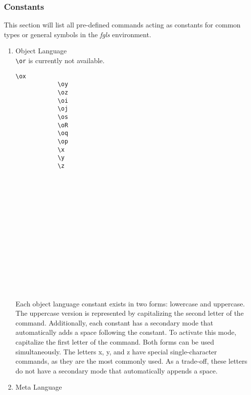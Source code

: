 \documentclass[10pt, a4paper]{article}
\begin{document}
	\subsubsection{Constants}
	This section will list all pre-defined commands acting as constants for common types or general symbols in the \textit{fgls} environment.
	\begin{enumerate}
		\item Object Language\\\verb=\or= is currently not available.
		\begin{center}
			\begin{minipage}[h][4.8cm][t]{15em}
				\begin{lstlisting}[style=B]
			\ox
			\oy
			\oz
			\oi
			\oj
			\os
			\oR
			\oq
			\op
			\x
			\y
			\z
				\end{lstlisting}
			\end{minipage}
			\begin{minipage}[h][4.8cm][t]{15em}
				\begin{fgls}
					\ \\
					\ox\\
					\oy\\
					\oz\\
					\oi\\
					\oj\\
					\os\\
					\oR\\
					\oq\\
					\op\\
					\x\\
					\y\\
					\z
				\end{fgls}
			\end{minipage}
		\end{center}
		Each object language constant exists in two forms: lowercase and uppercase. The uppercase version is represented by capitalizing the second letter of the command. Additionally, each constant has a secondary mode that automatically adds a space following the constant. To activate this mode, capitalize the first letter of the command. Both forms can be used simultaneously. The letters x, y, and z have special single-character commands, as they are the most commonly used. As a trade-off, these letters do not have a secondary mode that automatically appends a space.
		\item Meta Language
		\begin{center}
			\begin{minipage}[h][5cm][t]{15em}

\end{minipage}
\end{center}
\end{enumerate}
\end{document}
